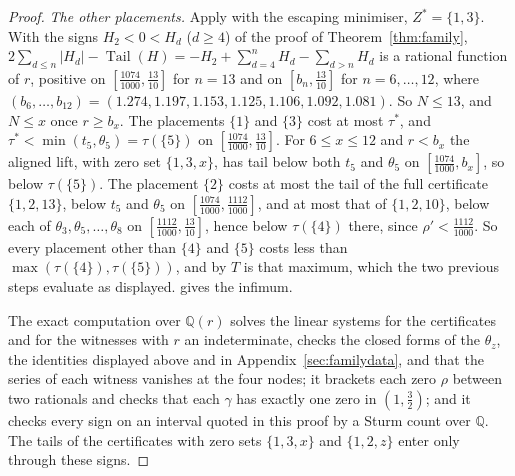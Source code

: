 \documentclass[11pt]{article}
\DeclareMathOperator{\Tail}{Tail}
\begin{document}
\begin{proof}
\emph{The other placements.}  Apply \cite[Theorem~5.3]{coefficient-mass-attainment} with the
escaping minimiser, $Z^*=\{1,3\}$.  With the signs $H_2<0<H_d$ ($d\ge4$) of
the proof of Theorem~\ref{thm:family},
$2\sum_{d\le n}|H_d|-\Tail(H)=-H_2+\sum_{d=4}^nH_d-\sum_{d>n}H_d$ is a
rational function of $r$, positive on $[\tfrac{1074}{1000},\tfrac{13}{10}]$
for $n=13$ and on $[b_n,\tfrac{13}{10}]$ for $n=6,\ldots,12$, where
$(b_6,\ldots,b_{12})=(1.274,1.197,1.153,1.125,1.106,1.092,1.081)$.  So
$N\le13$, and $N\le x$ once $r\ge b_x$.  The placements $\{1\}$ and $\{3\}$
cost at most $\tau^*$, and $\tau^*<\min(t_5,\theta_5)=\tau(\{5\})$ on
$[\tfrac{1074}{1000},\tfrac{13}{10}]$.  For $6\le x\le12$ and $r<b_x$ the
aligned lift, with zero set $\{1,3,x\}$, has tail below both $t_5$ and
$\theta_5$ on $[\tfrac{1074}{1000},b_x]$, so below $\tau(\{5\})$.  The
placement $\{2\}$ costs at most the tail of the full certificate
$\{1,2,13\}$, below $t_5$ and $\theta_5$ on
$[\tfrac{1074}{1000},\tfrac{1112}{1000}]$, and at most that of $\{1,2,10\}$,
below each of $\theta_3,\theta_5,\ldots,\theta_8$ on
$[\tfrac{1112}{1000},\tfrac{13}{10}]$, hence below $\tau(\{4\})$ there,
since $\rho'<\tfrac{1112}{1000}$.  So every placement other than $\{4\}$ and
$\{5\}$ costs less than $\max(\tau(\{4\}),\tau(\{5\}))$, and by
\cite[Theorem~5.3(c)]{coefficient-mass-attainment} $T$ is that maximum, which the two previous
steps evaluate as displayed.  \cite[Theorem~3.1]{coefficient-mass-attainment} gives the infimum.

The exact computation over $\mathbb Q(r)$ solves the linear systems for the
certificates and for the witnesses with $r$ an indeterminate, checks the
closed forms of the $\theta_z$, the identities displayed above and in
Appendix~\ref{sec:familydata}, and that the series of each witness vanishes
at the four nodes; it brackets each zero $\rho$ between two rationals and
checks that each $\gamma$ has exactly one zero in $(1,\tfrac32)$; and it
checks every sign on an interval quoted in this proof by a Sturm count over
$\mathbb Q$.  The tails of the certificates with zero sets $\{1,3,x\}$ and
$\{1,2,z\}$ enter only through these signs.
\end{proof}
\end{document}
